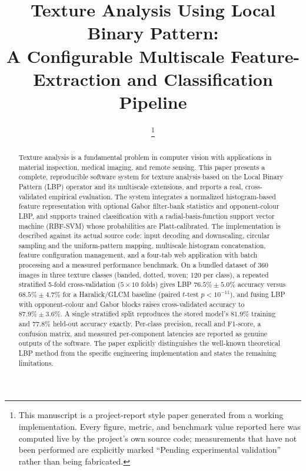 \documentclass[conference]{IEEEtran}
\begin{document}
\title{Texture Analysis Using Local Binary Pattern:\\ A Configurable
Multiscale Feature-Extraction and Classification Pipeline}

\author{

\thanks{This manuscript is a project-report style paper generated from a
working implementation. Every figure, metric, and benchmark value reported
here was computed live by the project's own source code; measurements that
have not been performed are explicitly marked ``Pending experimental
validation'' rather than being fabricated.}}

\maketitle

\begin{abstract}
Texture analysis is a fundamental problem in computer vision with
applications in material inspection, medical imaging, and remote sensing.
This paper presents a complete, reproducible software system for texture
analysis based on the Local Binary Pattern (LBP) operator and its
multiscale extensions, and reports a real, cross-validated empirical
evaluation. The system integrates a normalized histogram-based feature
representation with optional Gabor filter-bank statistics and
opponent-colour LBP, and supports trained classification with a
radial-basis-function support vector machine (RBF-SVM) whose probabilities
are Platt-calibrated. The implementation is described against its actual
source code: input decoding and downscaling, circular sampling and the
uniform-pattern mapping, multiscale histogram concatenation, feature
configuration management, and a four-tab web application with batch
processing and a measured performance benchmark. On a bundled dataset of
360 images in three texture classes (banded, dotted, woven; 120 per class),
a repeated stratified 5-fold cross-validation ($5\times10$ folds) gives LBP
$76.5\%\pm5.0\%$ accuracy versus $68.5\%\pm4.7\%$ for a Haralick/GLCM
baseline (paired $t$-test $p<10^{-11}$), and fusing LBP with opponent-colour
and Gabor blocks raises cross-validated accuracy to $87.9\%\pm3.6\%$. A
single stratified split reproduces the stored model's $81.9\%$ training and
$77.8\%$ held-out accuracy exactly. Per-class precision, recall and
F1-score, a confusion matrix, and measured per-component latencies are
reported as genuine outputs of the software. The paper explicitly
distinguishes the well-known theoretical LBP method from the specific
engineering implementation and states the remaining limitations.
\end{abstract}
\end{document}
